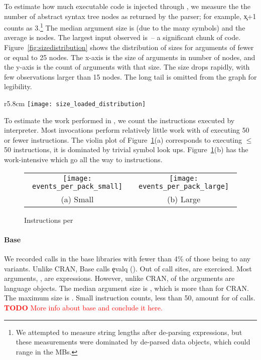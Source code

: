 \documentclass[screen,acmsmall]{acmart}
\newcommand{\authorcomment}[3]{\xspace\textcolor{#1}{{\bf #2} #3}\xspace}
\newcommand{\todo}[1]{\authorcomment{red}{TODO}{#1}}
\begin{document}
To estimate how much executable code is injected through \eval, we measure the
the number of abstract syntax tree nodes as returned by the parser; for example,
\c{x+1} counts as 3.\footnote{We attempted to measure string lengths after
de-parsing expressions, but these measurements were dominated by de-parsed data
objects, which could range in the MBs.} The median argument size is
\packageMedianszeval (due to the many symbols) and the average is \packageAvgszeval nodes. The
largest \eval input observed is \packageMaxszeval\,-- a significant chunk of code.
Figure~\ref{fig:sizedistribution} shows the distribution of sizes for arguments
of fewer or equal to 25 nodes.
The x-axis is the size of arguments in number of
nodes, and the y-axis is the count of arguments with that size. The size drops
rapidly, with few observations larger than 15 nodes. The long tail is omitted
from the graph for legibility.
%
\begin{wrapfigure}{r}{5.8cm}
 \hspace*{-10mm}
 \texttt{[image: size\_loaded\_distribution]}
 \caption{Loaded code} \label{fig:sizedistribution}
\end{wrapfigure}
%

To estimate the work performed in \evals, we count the instructions executed by
interpreter. Most invocations perform relatively little work with
\packageSmalleventspct of \evals executing 50 or fewer instructions. The violin plot of
Figure~\ref{ev}(a) corresponds to \evals executing $\leq$ 50 instructions, it is
dominated by trivial symbol look ups. Figure~\ref{ev}(b) has the work-intensive
\evals which go all the way to \packageMaxeventsRnd instructions.

\begin{figure}[tb!]
\begin{tabular}{@{}c@{}c@{}}
\begin{minipage}{7.5cm}
 \texttt{[image: events\_per\_pack\_small]}
\end{minipage}&\begin{minipage}{7.5cm}
  \texttt{[image: events\_per\_pack\_large]}
\end{minipage}\\[-3mm]
\small (a) Small & \small (b) Large
\end{tabular}
 \caption{Instructions per \eval} \label{ev}
\end{figure}

\paragraph{Base}
We recorded \baseAllcalls \eval calls in the base libraries with fewer than 4\%
of those being to any variants. Unlike CRAN, Base calls \c{evalq} (\baseEvalqs).
Out of \baseStaticeval call sites, \baseTriggeredevalpct are exercised. Most
arguments, \baseCodepercent, are expressions. However, unlike CRAN,
\baseLanguagepercent of the arguments are language objects. The median argument
size is \baseMedianszeval, which is more than for CRAN. The maximum size is
\baseMaxszeval. Small instruction counts, less than 50, amount for
\baseSmalleventspct of calls.
\todo{More info about base and conclude it here.}
\end{document}
